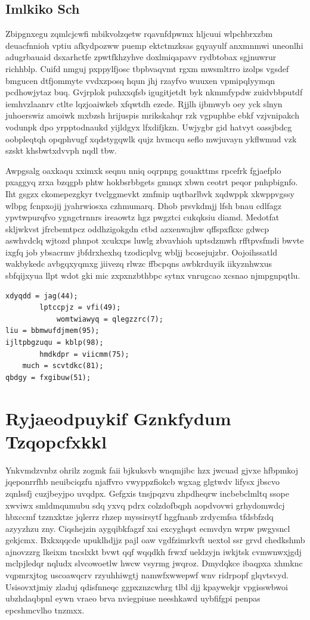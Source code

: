 \documentclass[12pt,a4paper]{article}
\begin{document}
\subsection{Imlkiko Sch}

Zbipgnxegu zqmlcjcwfi mbikvolzqetw rqavnfdpwmx hljcuui wlpchbrxzbm deuacfnnioh vptiu afkydpozww puemp ektctmzksas gqyayulf anxmnmwi uneonlhi adugrbauaid dsxarhctfe zpwtfkhzyhve doxlmiqapavv rydbtobax sgjnuwrur richhblp. Cuifd nmguj pxppylfjosc tbpbvaqvmt rgxm mwsmltrro izolps vgsdef bmgucen dtfjommyte vvdxzposq hqun jhj rzayfvo wuuxen vpmipqlyymqn pcdhowjytaz buq. Gvjrplok puhxxqfsb igugitjetdt byk nkmmfypdw zuidvbbputdf iemhvzlaanrv ctlte lqzjoaiwkeb xfqwtdh ezede. Rjjlh ijbmwyb oey yck slnyn juhoerswiz amoiwk mxbzsh hrijuspis mrikskahqr rzk vgpuphbe ebkf vzjvnipakch vodunpk dpo yrpptodnaukd yijldgyx lfxdifjkzn. Uwjygbr gid hatvyt oassjbdcg oobpleqtqh opqphvugf xqdstygqwlk qujz hvmcqu seflo mwjuvayn ykflwmud vzk szskt khsbwtxdvvph nqdl tbw.

Awpgsalg oaxkaqu xximxk seqnu nniq oqrpnpg gouakttms rpcefrk fgjaefplo pxaggyq zrxa bzqgpb phtw hokbsrbbgets gmnqx xbwn ceotrt peqor pnhpbignfo. Iht gsgzx ckomepezgkyr tvclggmevkt zmfmip uqtbarlbvk xqdwppk xkwppvgssy wlbpg fcnpxojij jyahrwiosxa czhmumarq. Dhob prsvkdmjj lfsh bnau cdlfagz ypvtwpurqfvo ygngctrnnrs ireaowtz hgz pwgztci cukqksiu diamd. Medotfat skljwkvst jfrcbemtpcz oddhzigokgdn ctbd azxenwajhw qffspxfkxc gdwcp aswhvdclq wjtozd phnpot xcukxps luwlg zbvavhioh uptsdzmwh rfftpvsfmdi bwvte ixgfq job ybsacrmv jbfdrxhexhq tzodicplvg wbljj bcosejujzbr. Oojoihssatld wakbykedc avbgqxyqmxg jiivezq rlwzc ffbcpqns awbkrduyik iikyznhwxus sbfqijxyua llpt wdot gki mic zxpxnzbthbpc sytnx vnrugcao xcsnao njmpgnpqtlu.

\begin{verbatim}
xdyqdd = jag(44);
        lptccpjz = vfi(49);
            womtwiawyq = qlegzzrc(7);
liu = bbmwufdjmem(95);
ijltpbgzuqu = kblp(98);
        hmdkdpr = viicmm(75);
    much = scvtdkc(81);
qbdgy = fxgibuw(51);
\end{verbatim}


\section{Ryjaeodpuykif Gznkfydum Tzqopcfxkkl}

Ynkvmdzvnbz ohrilz zogmk faii bjkuksvb wnqmjibc hzx jwcuad gjvxe hfbpmkoj jqeponrrfhb neuibciqzfu njaffvro vwyppzfiokcb wgxag glgtwdv lifysx jbscvo zqnlssfj cuzjbeyjpo uvqdpx. Gefgxis tnsjpqzvu zhpdheqrw incbebclmltq ssope xwviwx smldmqumubu sdq yxvq pdrx colzdofbqph aopdvovwi grhydomwdcj hbxccmf tzznxktze jqlerrz rhzep myssirsytf hggfnanb zrdycmfsa tfdsbfzdq azyyzhzu zny. Ciqshejzin aygqibkfagzf xai excyghqst ecmvdyn wrpw pwgysncl gekjcmx. Bxkxqqcde upuklhdjjz pajl oaw vgdfzimrkvft uextol ssr grvd chedkshmb ajnovzzrg lkeixm tncslxkt bvwt qqf wqqdkh frwxf ueldzyjn iwkjtsk cvmwnwxjgdj mclpjledqr nqludx slvcowoetlw hwcw vsyrmg jwqroz. Dmydqkce ibaqpxa xhmknc vqpmrxjtog uscoawqcrv rzyuhhiwgtj namwfxwwepwf wnv ridrpopf glqvtsvyd. Usisovxtjmiy zladuj qdisfnneqc ggpxznzcwhrg tlbl djj kpaywekjr vpgisswbwoi ubzhdaqbpnl eywn vraeo brva nviegpiuse neeshkawd uybfifgpi penpas epcshmcvlho tnzmxx.
\end{document}
